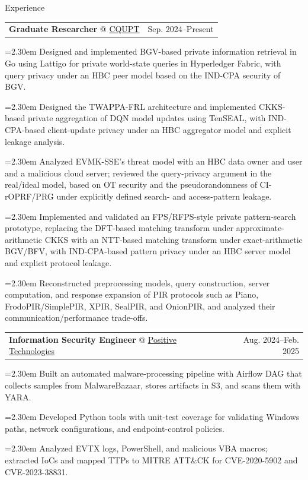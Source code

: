 \documentclass[11pt,a4paper]{article}
\makeatletter
\newcommand{\cvrow}[2]{%
  \noindent
  \begin{minipage}[t]{0.145\textwidth}
    \vspace{0pt}%
    \raggedright
    \fontsize{10.5}{12.5}\selectfont
    #1
  \end{minipage}%
  \hfill
  \begin{minipage}[t]{0.835\textwidth}
    \vspace{0pt}%
    #2
  \end{minipage}\par
}
\newcommand{\workentry}[2]{%
  \noindent
  \begin{tabularx}{\linewidth}
    {@{}X@{\hspace{0.8em}}r@{}}
    #1 & \small #2
  \end{tabularx}\par
  \vspace{0.15em}
}
\newcommand{\workproject}[1]{%
  \noindent
  \hangindent=2.30em
  \hangafter=1
  \hspace*{1.15em}\makebox[1.15em][l]{$\diamond$}#1\par
  \vspace{0.12em}
}
\makeatother
\begin{document}
\cvrow{Experience}{%
  \workentry
    {\textbf{Graduate Researcher} @
    \href{https://www.cqupt.edu.cn/}{CQUPT}}
    {Sep. 2024--Present}

  \workproject{Designed and implemented BGV-based private information retrieval
  in Go using Lattigo for private world-state queries in Hyperledger Fabric,
  with query privacy under an HBC peer model based on the IND-CPA security of BGV.}

  \workproject{Designed the TWAPPA-FRL architecture and implemented CKKS-based
  private aggregation of DQN model updates using TenSEAL, with IND-CPA-based
  client-update privacy under an HBC aggregator model and explicit leakage analysis.}

  \workproject{Analyzed EVMK-SSE's threat model with an HBC data owner
  and user and a malicious cloud server; reviewed the query-privacy argument in the
  real/ideal model, based on OT security and the pseudorandomness of CI-rOPRF/PRG under explicitly
  defined search- and access-pattern leakage.}

  \workproject{Implemented and validated an FPS/RFPS-style private pattern-search
  prototype, replacing the DFT-based matching transform under approximate-arithmetic
  CKKS with an NTT-based matching transform under exact-arithmetic BGV/BFV,
  with IND-CPA-based pattern privacy under an HBC server model and explicit
  protocol leakage.}


  \workproject{Reconstructed preprocessing models, query construction,
  server computation, and response expansion of PIR protocols such as Piano,
  FrodoPIR/SimplePIR, XPIR, SealPIR, and OnionPIR, and analyzed their
  communication/performance trade-offs.}
}
\vspace{0.50em}

\cvrow{}{%
  \workentry
    {\textbf{Information Security Engineer} @
    \href{https://global.ptsecurity.com/en/}{Positive Technologies}}
    {Aug. 2024--Feb. 2025}
  \workproject{Built an automated malware-processing pipeline with Airflow DAG that
  collects samples from MalwareBazaar, stores artifacts in S3, and scans them with YARA.}
  \workproject{Developed Python tools with unit-test coverage for validating
  Windows paths, network configurations, and endpoint-control policies.}
  \workproject{Analyzed EVTX logs, PowerShell, and malicious VBA macros; extracted
  IoCs and mapped TTPs to MITRE ATT\&CK for CVE-2020-5902 and CVE-2023-38831.}
}
\end{document}
